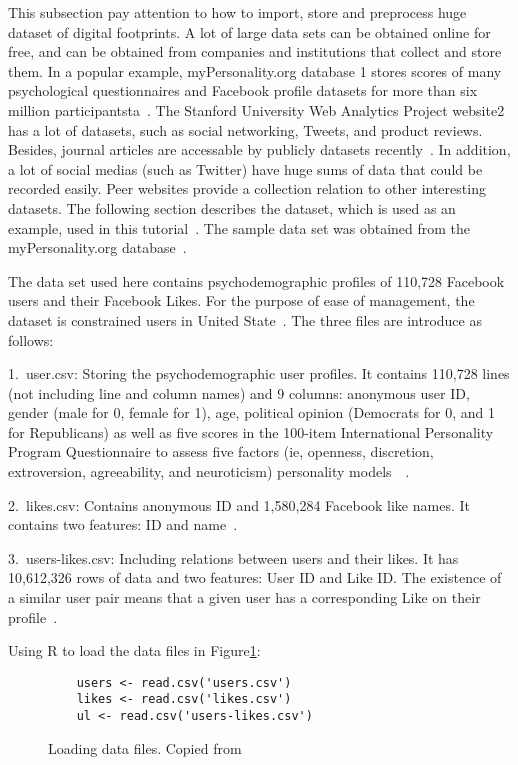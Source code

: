 This subsection pay attention to how to import, 
store and preprocess huge dataset of digital footprints. 
A lot of large data sets can be obtained
 online for free, and can be obtained from companies and 
institutions that collect and store them. In a popular example, 
myPersonality.org database 1 stores scores of many 
psychological questionnaires and Facebook profile datasets 
for more 
than six million participantsta~\cite{hid515-11}. 
The Stanford University Web
Analytics Project website2 has a lot of datasets, such as
 social networking, Tweets, and product reviews. 
Besides, 
journal articles are accessable by publicly datasets 
recently~\cite{hid515-11}. 
 In addition, a lot of social medias (such as Twitter) 
have huge sums of data that could be recorded easily. 
Peer websites provide a collection relation to other interesting 
datasets. The following section 
describes the dataset, which is used as an example, used in this 
tutorial~\cite{hid515-11}. The sample 
data set was obtained from the myPersonality.org 
database~\cite{hid515-11}.

The data set used here contains psychodemographic profiles of 
110,728 Facebook users and their Facebook Likes. 
For the purpose of ease of management, the dataset is 
constrained users in 
United State~\cite{hid515-11}. 
The three files are introduce as follows:

1.\ user.csv: Storing the psychodemographic user profiles. It 
contains 
110,728 lines (not including line and column names) and 9 columns:
 anonymous user ID, gender (male for 0, female for 1), age, 
political opinion (Democrats for 0, and 1 for Republicans) 
as well as five scores in the 100-item International Personality 
Program Questionnaire to assess five factors (ie, openness, 
discretion, extroversion, agreeability, and neuroticism) 
personality models~\cite{hid515-18}~\cite{hid515-11}.

2.\ likes.csv: Contains anonymous ID and 1,580,284 Facebook like 
names. It contains two features: ID and name~\cite{hid515-11}.

3.\ users-likes.csv: Including relations between users and their 
likes. It has 10,612,326 rows of data and two 
features: User ID and Like ID. The existence of a similar user pair
 means that a given user has a corresponding Like on their 
profile~\cite{hid515-11}.

Using R to load the data files in Figure\ref{F:loading}:

\begin{figure}[htb]
\begin{footnotesize}
\begin{verbatim}
    users <- read.csv('users.csv')
    likes <- read.csv('likes.csv')
    ul <- read.csv('users-likes.csv')
\end{verbatim}
\end{footnotesize}
\caption{Loading data files. Copied from~\cite{hid515-12}}
\label{F:loading}
\end{figure}

